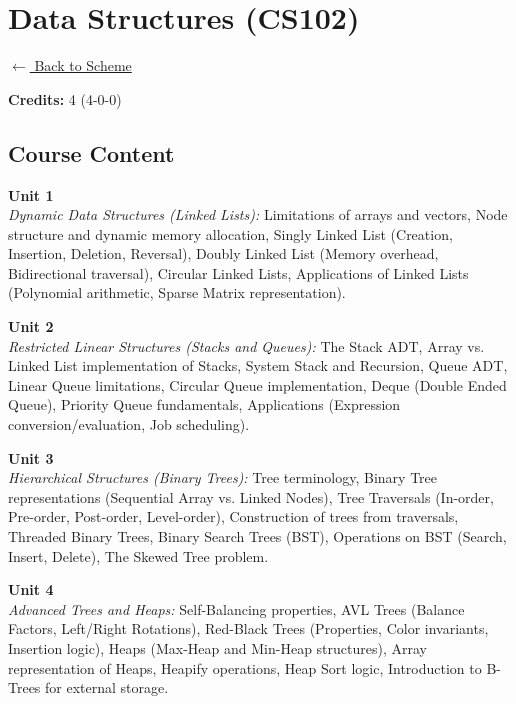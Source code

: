 \section*{Data Structures (CS102)}
\label{course:CS102}

\noindent \small{\hyperref[main:scheme]{$\leftarrow$ Back to Scheme}} \vspace{0.5cm}

\noindent \textbf{Credits:} 4 (4-0-0)

\subsection*{Course Content}
\noindent\textbf{Unit 1} \\
\textit{Dynamic Data Structures (Linked Lists):} Limitations of arrays and vectors, Node structure and dynamic memory allocation, Singly Linked List (Creation, Insertion, Deletion, Reversal), Doubly Linked List (Memory overhead, Bidirectional traversal), Circular Linked Lists, Applications of Linked Lists (Polynomial arithmetic, Sparse Matrix representation).

\vspace{0.3cm}

\noindent\textbf{Unit 2} \\
\textit{Restricted Linear Structures (Stacks and Queues):} The Stack ADT, Array vs. Linked List implementation of Stacks, System Stack and Recursion, Queue ADT, Linear Queue limitations, Circular Queue implementation, Deque (Double Ended Queue), Priority Queue fundamentals, Applications (Expression conversion/evaluation, Job scheduling).

\vspace{0.3cm}

\noindent\textbf{Unit 3} \\
\textit{Hierarchical Structures (Binary Trees):} Tree terminology, Binary Tree representations (Sequential Array vs. Linked Nodes), Tree Traversals (In-order, Pre-order, Post-order, Level-order), Construction of trees from traversals, Threaded Binary Trees, Binary Search Trees (BST), Operations on BST (Search, Insert, Delete), The Skewed Tree problem.

\vspace{0.3cm}

\noindent\textbf{Unit 4} \\
\textit{Advanced Trees and Heaps:} Self-Balancing properties, AVL Trees (Balance Factors, Left/Right Rotations), Red-Black Trees (Properties, Color invariants, Insertion logic), Heaps (Max-Heap and Min-Heap structures), Array representation of Heaps, Heapify operations, Heap Sort logic, Introduction to B-Trees for external storage.


